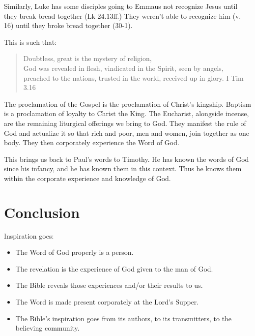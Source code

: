 \documentclass{beamer}
\begin{document}
\begin{frame}
  Similarly, Luke has some disciples going to Emmaus not recognize Jesus until they break bread together (Lk 24.13ff.)
  They weren't able to recognize him (v. 16) until they broke bread together (30-1).
\end{frame}

\begin{frame}
  This is such that:
  \begin{quote}
	Doubtless, great is the mystery of religion,\\
	God was revealed in flesh, vindicated in the Spirit, seen by angels, preached to the nations, trusted in the world, received up in glory. I Tim 3.16
  \end{quote}
\end{frame}

\begin{frame}
  The proclamation of the Gospel is the proclamation of Christ's kingship.
  Baptism is a proclamation of loyalty to Christ the King.
  The Eucharist, alongside incense, are the remaining liturgical offerings we bring to God.
  They manifest the rule of God and actualize it so that rich and poor, men and women, join together as one body.
  They then corporately experience the Word of God.
\end{frame}

\begin{frame}
  This brings us back to Paul's words to Timothy.
  He has known the words of God since his infancy, and he has known them in this context.
  Thus he knows them within the corporate experience and knowledge of God.
\end{frame}

\section{Conclusion}

\begin{frame}
  Inspiration goes:\pause
  \begin{itemize}
	\item The Word of God properly is a person.\pause
	\item The revelation is the experience of God given to the man of God.\pause
	\item The Bible reveals those experiences and/or their results to us.\pause
	\item The Word is made present corporately at the Lord's Supper.\pause
	\item The Bible's inspiration goes from its authors, to its transmitters, to the believing community.
  \end{itemize}
\end{frame}
\end{document}
